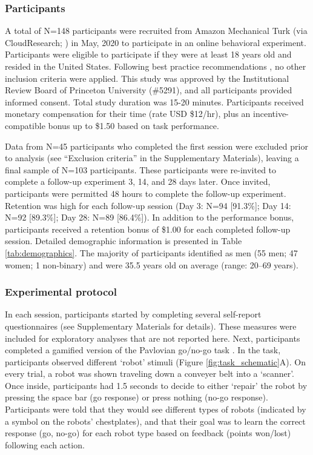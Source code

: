 \documentclass[a4paper,12pt]{article}
\begin{document}
\begin{refsection}[main]
\subsubsection*{Participants}

A total of N=148 participants were recruited from Amazon Mechanical Turk (via CloudResearch; \cite{litman2017turkprime}) in May, 2020 to participate in an online behavioral experiment. Participants were eligible to participate if they were at least 18 years old and resided in the United States. Following best practice recommendations \cite{robinson2019tapped}, no other inclusion criteria were applied. This study was approved by the Institutional Review Board of Princeton University (\#5291), and all participants provided informed consent. Total study duration was 15-20 minutes. Participants received monetary compensation for their time (rate USD \$12/hr), plus an incentive-compatible bonus up to \$1.50 based on task performance. 

Data from N=45 participants who completed the first session were excluded prior to analysis (see ``Exclusion criteria'' in the Supplementary Materials), leaving a final sample of N=103 participants. These participants were re-invited to complete a follow-up experiment 3, 14, and 28 days later. Once invited, participants were permitted 48 hours to complete the follow-up experiment. Retention was high for each follow-up session (Day 3: N=94 [91.3\%]; Day 14: N=92 [89.3\%]; Day 28: N=89 [86.4\%]). In addition to the performance bonus, participants received a retention bonus of \$1.00 for each completed follow-up session. Detailed demographic information is presented in Table \ref{tab:demographics}. The majority of participants identified as men (55 men; 47 women; 1 non-binary) and were 35.5 years old on average (range: 20--69 years).

\subsubsection*{Experimental protocol}

In each session, participants started by completing several self-report questionnaires (see Supplementary Materials for details). These measures were included for exploratory analyses that are not reported here. Next, participants completed a gamified version of the Pavlovian go/no-go task \cite{guitart2012go, swart2017catecholaminergic}. In the task, participants observed different `robot' stimuli (Figure \ref{fig:task_schematic}A). On every trial, a robot was shown traveling down a conveyer belt into a `scanner'. Once inside, participants had 1.5 seconds to decide to either `repair' the robot by pressing the space bar (go response) or press nothing (no-go response). Participants were told that they would see different types of robots (indicated by a symbol on the robots' chestplates), and that their goal was to learn the correct response (go, no-go) for each robot type based on feedback (points won/lost) following each action.


\end{refsection}
\end{document}
